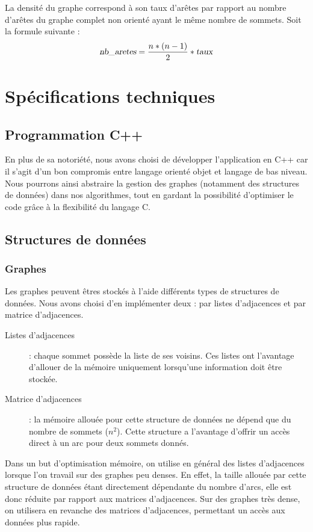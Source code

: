 La densité du graphe correspond à son taux d'arêtes par rapport au nombre d'arêtes du graphe complet non orienté ayant le même nombre de sommets. Soit la formule suivante :
\[ \textsl{nb\_aretes} = \frac{n*(n-1)}{2}*\textsl{taux}\]

\section{Spécifications techniques}

\subsection{Programmation C++}
En plus de sa notoriété, nous avons choisi de développer l'application en C++ car il s'agit d'un bon compromis entre langage orienté objet et langage de bas niveau. Nous pourrons ainsi abstraire la gestion des graphes (notamment des structures de données) dans nos algorithmes, tout en gardant la possibilité d'optimiser le code grâce à la flexibilité du langage C.

\subsection{Structures de données}

\subsubsection{Graphes}
Les graphes peuvent êtres stockés à l'aide différents types de structures de données. Nous avons choisi d'en implémenter deux :  par listes d'adjacences et par matrice d'adjacences.
\begin{description}
\item[Listes d'adjacences] : chaque sommet possède la liste de ses voisins. Ces listes ont l'avantage d'allouer de la mémoire uniquement lorsqu'une information doit être stockée. 
\item[Matrice d'adjacences] : la mémoire allouée pour cette structure de données ne dépend que du nombre de sommets ($n^2$). Cette structure a l'avantage d'offrir un accès direct à un arc pour deux sommets donnés.
\end{description}

Dans un but d'optimisation mémoire, on utilise en général des listes d'adjacences lorsque l'on travail sur des graphes peu denses. En effet, la taille allouée par cette structure de données étant directement dépendante du nombre d'arcs, elle est donc réduite par rapport aux matrices d'adjacences. Sur des graphes très dense, on utilisera en revanche des matrices d'adjacences, permettant un accès aux données plus rapide. 

